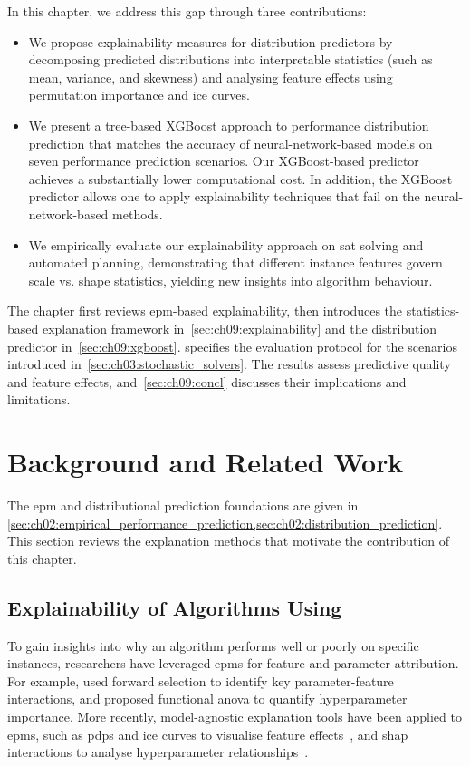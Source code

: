 In this chapter, we address this gap through three contributions:
\begin{itemize}
    \item We propose explainability measures for distribution predictors by decomposing predicted distributions into interpretable statistics (such as mean, variance, and skewness) and analysing feature effects using permutation importance and \gls{ice} curves.
    \item We present a tree-based XGBoost approach to performance distribution prediction that matches the accuracy of neural-network-based models on seven performance prediction scenarios. Our XGBoost-based predictor achieves a substantially lower computational cost. In addition, the XGBoost predictor allows one to apply explainability techniques that fail on the neural-network-based methods.
    \item We empirically evaluate our explainability approach on \gls{sat} solving and automated planning, demonstrating that different instance features govern scale vs. shape statistics, yielding new insights into algorithm behaviour.
\end{itemize}

The chapter first reviews \gls{epm}-based explainability, then introduces the statistics-based explanation framework in~\cref{sec:ch09:explainability} and the distribution predictor in~\cref{sec:ch09:xgboost}.  specifies the evaluation protocol for the scenarios introduced in~\cref{sec:ch03:stochastic_solvers}. The results assess predictive quality and feature effects, and~\cref{sec:ch09:concl} discusses their implications and limitations.

\section{Background and Related Work}
\label{sec:ch09:bg}

The \gls{epm} and distributional prediction foundations are given in \cref{sec:ch02:empirical_performance_prediction,sec:ch02:distribution_prediction}. This section reviews the explanation methods that motivate the contribution of this chapter.

\subsection{Explainability of Algorithms Using }
To gain insights into why an algorithm performs well or poorly on specific instances, researchers have leveraged \glspl{epm} for feature and parameter attribution. For example, \citet{HutEtAl13} used forward selection to identify key parameter-feature interactions, and \citet{HutEtAl14b} proposed functional \gls{anova} to quantify hyperparameter importance. More recently, model-agnostic explanation tools have been applied to \glspl{epm}, such as \glspl{pdp} and \gls{ice} curves to visualise feature effects~\citep{MooEtAl21}, and \gls{shap} interactions to analyse hyperparameter relationships~\citep{WevEtAl26}.

